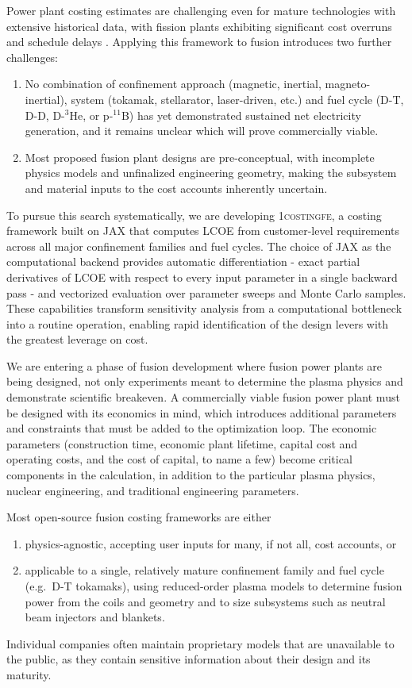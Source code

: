 \documentclass{article}
\begin{document}
Power plant costing estimates are challenging even for mature technologies
with extensive historical data, with fission plants exhibiting significant
cost overruns and schedule delays \citep{eashgates2020}. Applying this
framework to fusion introduces two further challenges:
\begin{enumerate}
\item No combination of confinement approach (magnetic, inertial,
  magneto-inertial), system (tokamak, stellarator, laser-driven, etc.)
  and fuel cycle (D-T, D-D, D-${}^3$He, or p-${}^{11}$B) has yet
  demonstrated sustained net electricity generation, and it remains unclear
  which will prove commercially viable.
\item Most proposed fusion plant designs are pre-conceptual, with
  incomplete physics models and unfinalized engineering geometry, making
  the subsystem and material inputs to the cost accounts inherently
  uncertain.
\end{enumerate}

To pursue this search systematically, we are developing \textsc{1costingfe}, a
costing framework built on JAX that computes LCOE from customer-level
requirements across all major confinement families and fuel cycles. The
choice of JAX as the computational backend provides automatic
differentiation - exact partial derivatives of LCOE with respect to every
input parameter in a single backward pass - and vectorized evaluation over
parameter sweeps and Monte Carlo samples. These capabilities transform
sensitivity analysis from a computational bottleneck into a routine
operation, enabling rapid identification of the design levers with the
greatest leverage on cost.

We are entering a phase of fusion development where fusion power plants are being designed,
not only experiments meant to determine the plasma physics and demonstrate scientific breakeven.
A commercially viable fusion power plant must be designed with its economics in mind, which introduces
additional parameters and constraints that must be added to the optimization loop.
The economic parameters (construction time, economic plant lifetime, capital cost and operating costs,
and the cost of capital, to name a few) become critical components in the calculation, in addition to the
particular plasma physics, nuclear engineering, and traditional engineering parameters.

Most open-source fusion costing frameworks are either
\begin{enumerate}
\item physics-agnostic, accepting user inputs for many, if not all, cost
  accounts, or
\item applicable to a single, relatively mature confinement family and fuel
  cycle (e.g.\ D-T tokamaks), using reduced-order plasma models to
  determine fusion power from the coils and geometry and to size subsystems
  such as neutral beam injectors and blankets.
\end{enumerate}
Individual companies often maintain proprietary models that are unavailable
to the public, as they contain sensitive information about their design and
its maturity.
\end{document}

